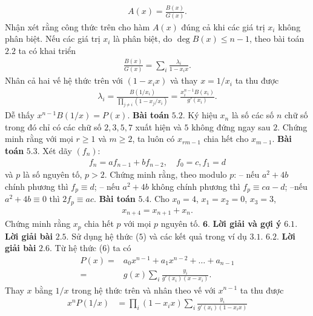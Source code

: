 \begin{multicols}{2}
\begin{align*}
		A(x)= \frac{B(x)}{G(x)}.
	\end{align*}
	Nhận xét rằng công thức trên cho hàm $A(x)$ đúng cả khi các giá trị $x_i$ không phân biệt. 
	\vskip 0.1cm	
	Nếu các giá trị $x_i$ là phân biệt, do $\deg B(x)\leq n-1$, theo bài toán $2.2$ ta có khai triển
	\begin{align*}
		\frac{B(x)}{G(x)}=\sum_i\frac{\lambda_i}{1-x_i x}.
	\end{align*}
	Nhân cả hai vế hệ thức trên với $(1-x_ix)$ và thay $x=1/x_i$ ta thu được
	\begin{align*}
		\lambda_i=\frac{B(1/x_i)}{\prod_{j\neq i}(1-x_j/x_i)} = 
		\frac{x_i^{n-1}B(x_i)}{g'(x_i)}.
	\end{align*}
	Dễ thấy { $x^{n-1}B(1/x)=P(x).$}
	\vskip 0.1cm	
	\textbf{\color{hoccungpi}Bài toán} $\pmb{5.2.}$ Ký hiệu $x_n$ là số các số $n$ chữ số trong đó chỉ có các chữ số $2,3,5,7$ xuất hiện và $5$ không đứng ngay sau $2$. Chứng minh rằng với mọi $r\geq 1$ và $m\geq2$, ta luôn có $x_{rm-1}$ chia hết cho $x_{m-1}$.
	\vskip 0.1cm
	\textbf{\color{hoccungpi}Bài toán} $\pmb{5.3.}$ Xét dãy $(f_n)$:
	\begin{align*}
		f_n=a f_{n-1}+b f_{n-2}, \quad f_0=c, f_1=d
	\end{align*}
	và $p$ là số nguyên tố, $p>2$. Chứng minh rằng, theo modulo $p$:
	\vskip 0.1cm
	-- nếu $a^2+4b$ chính phương thì $f_p\equiv d$;
	\vskip 0.1cm 
	-- nếu $a^2+4b$ không chính phương thì $f_p\equiv ca-d$;
	\vskip 0.1cm
	--nếu $a^2+4b\equiv 0$ thì $2f_p\equiv ac$.
	\vskip 0.1cm
	\textbf{\color{hoccungpi}Bài toán} $\pmb{5.4.}$  Cho $x_0=4$, $x_1=x_2=0$, $x_3=3$,
	\begin{align*}
		x_{n+4}=x_{n+1}+x_n.
	\end{align*}
	Chứng minh rằng $x_p$ chia hết $p$ với mọi $p$ nguyên tố.
	\vskip 0.1cm	
	$\pmb{6.}$ \textbf{\color{hoccungpi}Lời giải và gợi ý}
	\vskip 0.1cm
	$\pmb{6.1.}$ \textbf{\color{hoccungpi}Lời giải bài} $\pmb{2.5.}$ Sử dụng hệ thức ($5$) và các kết quả trong ví dụ $3.1$. 
	\vskip 0.1cm
	$\pmb{6.2.}$ \textbf{\color{hoccungpi}Lời giải bài} $\pmb{2.6.}$
	Từ hệ thức ($6$) ta có
	\begin{align*}
		P(x)=&a_0x^{n-1}+a_1x^{n-2}+\ldots+a_{n-1}\\
		=&g(x)\sum_i \frac{y_i}{g'(x_i)(x-x_i)}.
	\end{align*}
	Thay $x$ bằng $1/x$ trong hệ thức trên và nhân theo vế với $x^{n-1}$ ta thu được
	\begin{align*}
		x^nP(1/x)&=\prod_i(1-x_i x)\sum_i\frac{y_i}{g'(x_i)(1-x_i x)}\\

\end{align*}
\end{multicols}
